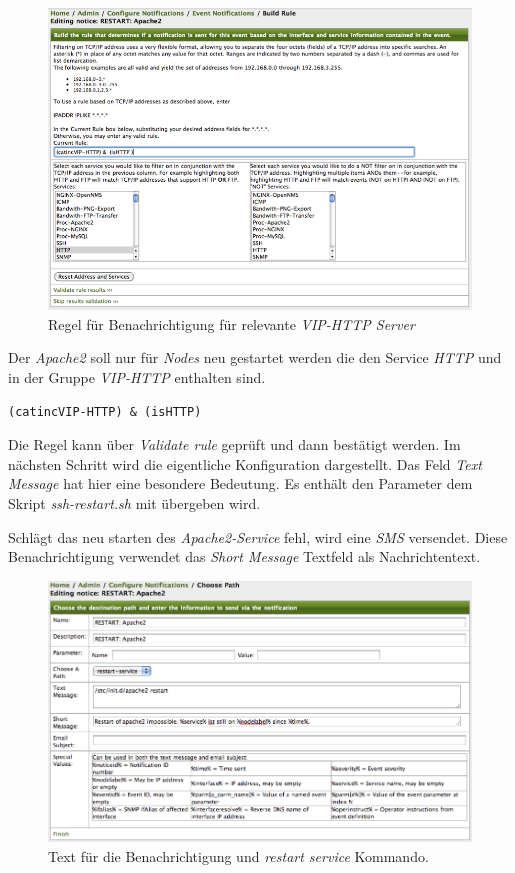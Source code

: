 \begin{figure}[H]
	\centering
	\includegraphics[width=1.0\textwidth]{images/use-cases/service-recovery/notification-rule}
	\caption{Regel für Benachrichtigung für relevante \emph{VIP-HTTP Server}}
	\label{pic:notification-rule-VIP-HTTP}
\end{figure}

Der \emph{Apache2} soll nur für \emph{Nodes} neu gestartet werden die den Service \emph{HTTP} und in der Gruppe \emph{VIP-HTTP} enthalten sind.

\begin{lstlisting}[numbers=none]
(catincVIP-HTTP) & (isHTTP)
\end{lstlisting}

Die Regel kann über \emph{Validate rule } geprüft und dann bestätigt werden. Im nächsten Schritt wird die eigentliche Konfiguration dargestellt. Das Feld \emph{Text Message} hat hier eine besondere Bedeutung. Es enthält den Parameter dem Skript \emph{ssh-restart.sh} mit übergeben wird.

Schlägt das neu starten des \emph{Apache2-Service} fehl, wird eine \emph{SMS} versendet. Diese Benachrichtigung verwendet das \emph{Short Message} Textfeld als Nachrichtentext.

\begin{figure}[H]
	\centering
	\includegraphics[width=1.0\textwidth]{images/use-cases/service-recovery/notification-text}
	\caption{Text für die Benachrichtigung und \emph{restart service} Kommando.}
	\label{pic:notification-text}
\end{figure}

